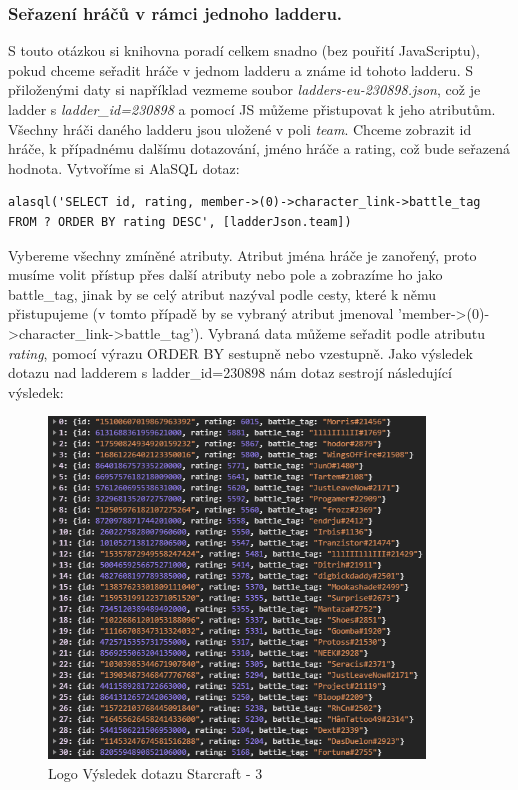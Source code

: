 \documentclass[a4, titlepage]{article}
\begin{document}
\subsubsection{Seřazení hráčů v rámci jednoho ladderu.}
S touto otázkou si knihovna poradí celkem snadno (bez pouřití JavaScriptu), pokud chceme seřadit hráče v jednom ladderu a známe id tohoto ladderu. S přiloženými daty si například vezmeme soubor \textit{ladders-eu-230898.json}, což je ladder s \textit{ladder\_id=230898} a pomocí JS můžeme přistupovat k jeho atributům. Všechny hráči daného ladderu jsou uložené v poli \textit{team}. Chceme zobrazit id hráče, k případnému dalšímu dotazování, jméno hráče a rating, což bude seřazená hodnota. Vytvoříme si AlaSQL dotaz:
\begin{lstlisting}
alasql('SELECT id, rating, member->(0)->character_link->battle_tag  
FROM ? ORDER BY rating DESC', [ladderJson.team])
\end{lstlisting}
Vybereme všechny zmíněné atributy. Atribut jména hráče je zanořený, proto musíme volit přístup přes další atributy nebo pole a zobrazíme ho jako battle\_tag, jinak by se celý atribut nazýval podle cesty, které k němu přistupujeme (v tomto případě by se vybraný atribut jmenoval 'member->(0)->character\_link->battle\_tag'). 
Vybraná data můžeme seřadit podle atributu \textit{rating}, pomocí výrazu ORDER BY sestupně nebo vzestupně. Jako výsledek dotazu nad ladderem s ladder\_id=230898 nám dotaz sestrojí následující výsledek:

\begin{figure}[h]
    \centering
    \includegraphics[width=10cm]{S3}
    \caption{Logo Výsledek dotazu Starcraft - 3}
\end{figure}
\end{document}
